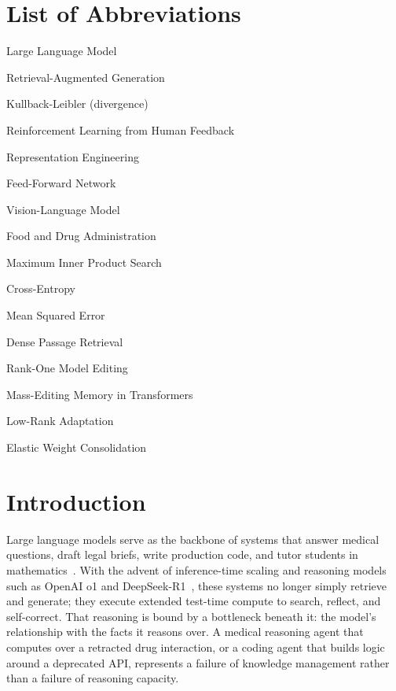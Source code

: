 \documentclass[manuscript, screen, review]{jair}
\begin{document}
\section*{List of Abbreviations}
\begin{description}[style=multiline, leftmargin=3cm, font=\bfseries]
  \item[LLM] Large Language Model
  \item[RAG] Retrieval-Augmented Generation
  \item[KL] Kullback-Leibler (divergence)
  \item[RLHF] Reinforcement Learning from Human Feedback
  \item[RepE] Representation Engineering
  \item[FFN] Feed-Forward Network
  \item[VLM] Vision-Language Model
  \item[FDA] Food and Drug Administration
  \item[MIPS] Maximum Inner Product Search
  \item[CE] Cross-Entropy
  \item[MSE] Mean Squared Error
  \item[DPR] Dense Passage Retrieval
  \item[ROME] Rank-One Model Editing
  \item[MEMIT] Mass-Editing Memory in Transformers
  \item[LoRA] Low-Rank Adaptation
  \item[EWC] Elastic Weight Consolidation
\end{description}

\section{Introduction}
\label{sec:introduction}

Large language models serve as the backbone of systems that answer medical questions, draft legal briefs, write production code, and tutor students in mathematics~\citep{brown2020language, achiam2023gpt4, team2023gemini}. With the advent of inference-time scaling and reasoning models such as OpenAI o1 and DeepSeek-R1~\citep{openai2024o1, guo2025deepseekr1}, these systems no longer simply retrieve and generate; they execute extended test-time compute to search, reflect, and self-correct. That reasoning is bound by a bottleneck beneath it: the model's relationship with the facts it reasons over. A medical reasoning agent that computes over a retracted drug interaction, or a coding agent that builds logic around a deprecated API, represents a failure of knowledge management rather than a failure of reasoning capacity.
\end{document}
